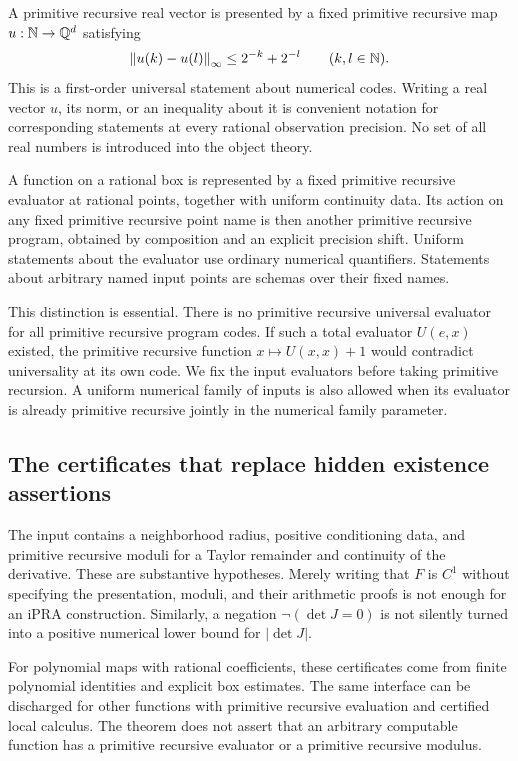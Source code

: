 A primitive recursive real vector is presented by a fixed primitive
recursive map \(u:\mathbb N\to\mathbb Q^d\) satisfying
\begin{equation}\label{eq:regular}
 \left\lVert u(k)-u(l)\right\rVert_\infty\le 2^{-k}+2^{-l}\qquad(k,l\in\mathbb N).
\end{equation}
This is a first-order universal statement about numerical codes.
Writing a real vector \(u\), its norm, or an inequality about it is
convenient notation for corresponding statements at every rational
observation precision. No set of all real numbers is introduced into
the object theory.

A function on a rational box is represented by a fixed primitive
recursive evaluator at rational points, together with uniform
continuity data. Its action on any fixed primitive recursive point
name is then another primitive recursive program, obtained by
composition and an explicit precision shift. Uniform statements about
the evaluator use ordinary numerical quantifiers. Statements about
arbitrary named input points are schemas over their fixed names.

This distinction is essential. There is no primitive recursive universal
evaluator for all primitive recursive program codes. If such a total
evaluator \(U(e,x)\) existed, the primitive recursive function
\(x\mapsto U(x,x)+1\) would contradict universality at its own code.
We fix the input evaluators before taking primitive recursion. A
uniform numerical family of inputs is also allowed when its evaluator
is already primitive recursive jointly in the numerical family
parameter.

\subsection{The certificates that replace hidden existence assertions}

The input contains a neighborhood radius, positive conditioning data,
and primitive recursive moduli for a Taylor remainder and continuity
of the derivative. These are substantive hypotheses. Merely writing
that \(F\) is \(C^1\) without specifying the presentation, moduli, and
their arithmetic proofs is not enough for an iPRA construction.
Similarly, a negation \(\neg(\det J=0)\) is not silently turned into a
positive numerical lower bound for \(|\det J|\).

For polynomial maps with rational coefficients, these certificates
come from finite polynomial identities and explicit box estimates.
The same interface can be discharged for other functions with
primitive recursive evaluation and certified local calculus. The
theorem does not assert that an arbitrary computable function has a
primitive recursive evaluator or a primitive recursive modulus.

